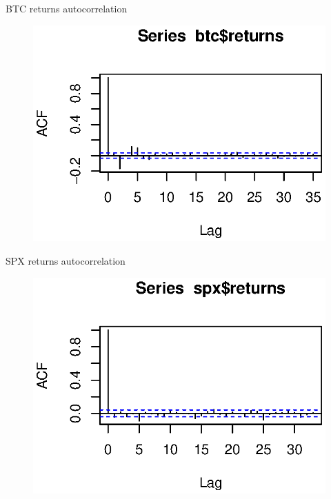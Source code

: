 \documentclass{beamer}
\begin{document}
\begin{frame}{BTC returns autocorrelation}
	\begin{figure}[linewidth=250mm]	
		\includegraphics{BTCautocor.eps}
	\end{figure}
\end{frame}
\begin{frame}{SPX returns autocorrelation}
	\begin{figure}[b]	
		\includegraphics{SPXautocor.eps}
	\end{figure}
\end{frame}
\end{document}
